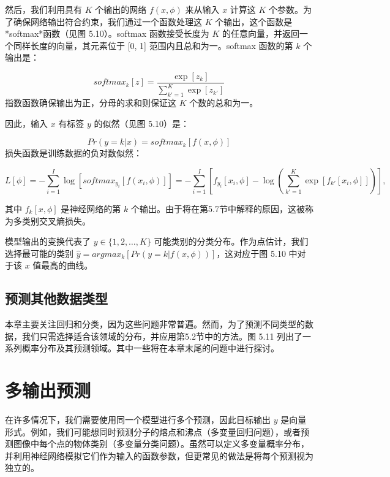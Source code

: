 然后，我们利用具有 \(K\) 个输出的网络 \(f(x, \phi)\) 来从输入 \(x\) 计算这 \(K\) 个参数。为了确保网络输出符合约束，我们通过一个函数处理这 \(K\) 个输出，这个函数是*softmax*函数（见图 5.10）。softmax 函数接受长度为 \(K\) 的任意向量，并返回一个同样长度的向量，其元素位于 [0, 1] 范围内且总和为一。softmax 函数的第 \(k\) 个输出是：

\begin{equation}
softmax_k[z] = \frac{\exp[z_k]}{\sum_{k'=1}^{K} \exp[z_{k'}]} 
\end{equation}
指数函数确保输出为正，分母的求和则保证这 \(K\) 个数的总和为一。

因此，输入 \(x\) 有标签 \(y\) 的似然（见图 5.10）是：

\begin{equation}
Pr(y = k|x) = softmax_k[f(x, \phi)] 
\end{equation}
损失函数是训练数据的负对数似然：

\begin{equation}
L[\phi] = -\sum_{i=1}^{I} \log \left[ softmax_{y_i} [f(x_i, \phi)] \right]
= -\sum_{i=1}^{I} \left[ f_{y_i}[x_i, \phi] - \log \left( \sum_{k'=1}^{K} \exp [f_{k'}[x_i, \phi]] \right) \right],
\end{equation}


其中 \(f_k[x, \phi]\) 是神经网络的第 \(k\) 个输出。由于将在第5.7节中解释的原因，这被称为多类别交叉熵损失。

模型输出的变换代表了 \(y \in \{1, 2, \ldots, K\}\) 可能类别的分类分布。作为点估计，我们选择最可能的类别 \(\hat{y} = argmax_k[Pr(y = k|f(x, \phi))]\)，这对应于图 5.10 中对于该 \(x\) 值最高的曲线。

\subsection{预测其他数据类型}

本章主要关注回归和分类，因为这些问题非常普遍。然而，为了预测不同类型的数据，我们只需选择适合该领域的分布，并应用第5.2节中的方法。图 5.11 列出了一系列概率分布及其预测领域。其中一些将在本章末尾的问题中进行探讨。

\section{多输出预测}
在许多情况下，我们需要使用同一个模型进行多个预测，因此目标输出 \(y\) 是向量形式。例如，我们可能想同时预测分子的熔点和沸点（多变量回归问题），或者预测图像中每个点的物体类别（多变量分类问题）。虽然可以定义多变量概率分布，并利用神经网络模拟它们作为输入的函数参数，但更常见的做法是将每个预测视为独立的。

